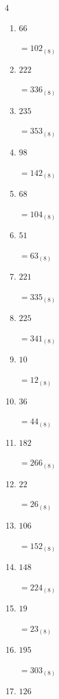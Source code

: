 \begin{multicols}{4}
\begin{enumerate}
  \item $66$

        $=102_{(8)}$

  \item $222$

        $=336_{(8)}$

  \item $235$

        $=353_{(8)}$

  \item $98$

        $=142_{(8)}$

  \item $68$

        $=104_{(8)}$

  \item $51$

        $=63_{(8)}$

  \item $221$

        $=335_{(8)}$

  \item $225$

        $=341_{(8)}$

  \item $10$

        $=12_{(8)}$

\columnbreak %

  \item $36$

        $=44_{(8)}$

  \item $182$

        $=266_{(8)}$

  \item $22$

        $=26_{(8)}$

  \item $106$

        $=152_{(8)}$

  \item $148$

        $=224_{(8)}$

  \item $19$

        $=23_{(8)}$

  \item $195$

        $=303_{(8)}$

  \item $126$


\end{enumerate}
\end{multicols}
